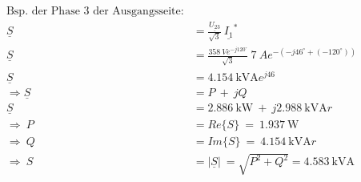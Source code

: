 \begin{enumerate}[label=\alph*)]
	      \begin{center}
		      \begin{align*}
			      \text{Bsp. der Phase 3 der Ausgangsseite:}                                                                                        \\
			      \underline{S}                 & = \frac{\underline{U_{23}}}{\sqrt{3}}\ \underline{I_{1}}^*                                                  \\
			      \underline{S}                 & = \frac{358\ Ve^{-j120^\circ}}{\sqrt{3}}\ 7\ Ae^{-(-j46^\circ+(-120^\circ))}                  \\
			      \underline{S}                 & = \SI{4,154}{\kilo\volt\ampere}e^{j46}                                                            \\
			      \Longrightarrow \underline{S} & =  P\ +\ jQ                                                                                       \\
			      \underline{S}                 & = \SI{2,886}{\kilo\watt}\ +\ j\SI{2,988}{\kilo\volt\ampere r}                                     \\
			      \Longrightarrow\ P            & = Re{\{S\}}\                                                   =\   \SI{1,937}{\watt}             \\
			      \Longrightarrow\ Q            & = Im{\{S\}}\                                                   =\ \SI{4,154}{\kilo\volt\ampere r} \\
			      \Longrightarrow\ S            & =  \left\lvert {\underline{S}}  \right\rvert\ = \sqrt{P^2+Q^2} = \SI{4,583}{\kilo\volt\ampere}    \\               \\
		      \end{align*}
	      \end{center}


\end{enumerate}
